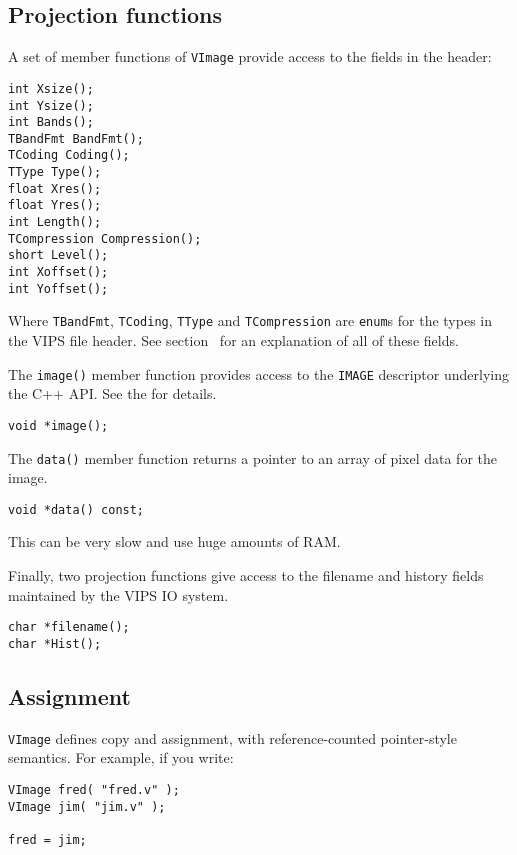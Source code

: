 \subsection{Projection functions}

A set of member functions of \verb+VImage+ provide access to the fields in
the header:

\begin{verbatim}
int Xsize();
int Ysize();
int Bands();
TBandFmt BandFmt();
TCoding Coding();
TType Type();
float Xres();
float Yres();
int Length();
TCompression Compression();
short Level();
int Xoffset();
int Yoffset();
\end{verbatim}

\noindent
Where \verb+TBandFmt+, \verb+TCoding+, \verb+TType+ and \verb+TCompression+
are \verb+enum+s for the types in the VIPS file header. See section~ for an explanation of all of these fields.

The \verb+image()+ member function provides access to the \verb+IMAGE+
descriptor underlying the C++ API. See the  for details.

\begin{verbatim}
void *image();
\end{verbatim}

The \verb+data()+ member function returns a pointer to an array of pixel data
for the image. 

\begin{verbatim}
void *data() const;
\end{verbatim}

\noindent
This can be very slow and use huge amounts of RAM.

Finally, two projection functions give access to the filename and history
fields maintained by the VIPS IO system.

\begin{verbatim}
char *filename();
char *Hist();
\end{verbatim}

\subsection{Assignment}

\verb+VImage+ defines copy and assignment, with reference-counted
pointer-style semantics.  For example, if you write:

\begin{verbatim}
VImage fred( "fred.v" );
VImage jim( "jim.v" );

fred = jim;
\end{verbatim}

